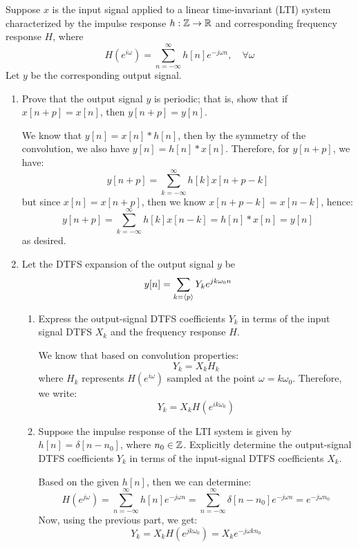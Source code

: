 \documentclass[10pt]{article}
\begin{document}
	Suppose \( x \) is the input signal applied to a linear time-invariant (LTI) system characterized by the impulse 
	response \( h: \mathbb Z \to \mathbb R \) and corresponding frequency response \( H \), where 
	\[
		H(e^{i \omega}) = \sum_{n=-\infty}^{\infty} h[n] e^{-j \omega n}, \quad \forall \omega
	\] 
	Let \( y \) be the corresponding output signal.
	\begin{enumerate}[label=\alph*)]
		\item Prove that the output signal \( y \) is periodic; that is, show that if  \( x[n + p] = x[n] \), then 
			\( y[n + p] = y[n] \). 

			\begin{solution}
				We know that \( y[n] = x[n] * h[n] \), then by the symmetry of the convolution, we also 
				have  \( y[n] = h[n] * x[n] \). Therefore, for \( y[n + p] \), we have:
				\[
					y[n + p] = \sum_{k=-\infty}^{\infty} h[k] x[n + p - k]
				\] 
				but since \( x[n] = x[n + p] \), then we know \( x[n + p - k] = x[n - k] \), hence:
				\[
					y[n + p] = \sum_{k=-\infty}^{\infty} h[k] x[n - k] = h[n] * x[n] = y[n]
				\] 
				as desired. 
			\end{solution}
			\item Let the DTFS expansion of the output signal \( y \) be
			\[
				y[n] = \sum_{k = \langle p \rangle} Y_k e^{j k \omega_0 n }
			\] 
			\begin{enumerate}[label=\roman*)]
				\item Express the output-signal DTFS coefficients \( Y_k \) in terms of the input signal DTFS
					\( X_k \) and the frequency response \( H \).

					\begin{solution}
						We know that based on convolution properties:
						\[
						Y_k = X_k H_k
						\] 
						where \( H_k \) represents \( H(e^{i \omega}) \) sampled at the point \( \omega = k \omega_0 \).
						Therefore, we write:
						\[
						Y_k = X_k H(e^{i k \omega_0})
						\] 
					\end{solution}
				\item Suppose the impulse response of the LTI system is given by 
					\( h[n] = \delta[n -  n_0] \), where \( n_0 \in \mathbb Z \). Explicitly determine the output-signal 
					DTFS coefficients \( Y_k \) in terms of the input-signal DTFS coefficients
					\( X_k \).

					\begin{solution}
						Based on the given \( h[n] \), then we can determine:
						\[
							H(e^{j \omega}) = \sum_{n=-\infty}^{\infty} h[n] e^{- j \omega n} = 
							\sum_{n=-\infty}^{\infty} \delta[n - n_0] e^{- j \omega n} = e^{- j \omega n_0}
						\] 
						Now, using the previous part, we get:
						\[
						Y_k = X_k H(e^{j k \omega_0}) = X_k e^{-j \omega k n_0}
						\] 
					\end{solution}
			\end{enumerate}
	\end{enumerate}
	\pagebreak
\end{document}
